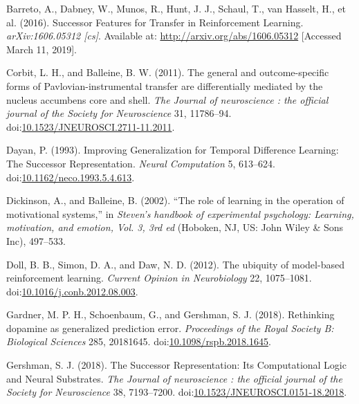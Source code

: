 \documentclass[
  11pt,
]{article}
\newlength{\cslhangindent}
\newlength{\cslentryspacingunit} %
\newenvironment{CSLReferences}[2] %
 {%
  \setlength{\parindent}{0pt}
  \ifodd #1
  \let\oldpar\par
  \def\par{\hangindent=\cslhangindent\oldpar}
  \fi
  \setlength{\parskip}{#2\cslentryspacingunit}
 }%
 {}
\begin{document}
\hypertarget{refs}{}
\begin{CSLReferences}{1}{0}
\leavevmode{}%
Barreto, A., Dabney, W., Munos, R., Hunt, J. J., Schaul, T., van
Hasselt, H., et al. (2016). Successor {Features} for {Transfer} in
{Reinforcement Learning}. \emph{arXiv:1606.05312 {[}cs{]}}. Available
at: \url{http://arxiv.org/abs/1606.05312} {[}Accessed March 11, 2019{]}.

\leavevmode{}%
Corbit, L. H., and Balleine, B. W. (2011). The general and
outcome-specific forms of {Pavlovian}-instrumental transfer are
differentially mediated by the nucleus accumbens core and shell.
\emph{The Journal of neuroscience : the official journal of the Society
for Neuroscience} 31, 11786--94.
doi:\href{https://doi.org/10.1523/JNEUROSCI.2711-11.2011}{10.1523/JNEUROSCI.2711-11.2011}.

\leavevmode{}%
Dayan, P. (1993). Improving {Generalization} for {Temporal Difference
Learning}: The {Successor Representation}. \emph{Neural Computation} 5,
613--624.
doi:\href{https://doi.org/10.1162/neco.1993.5.4.613}{10.1162/neco.1993.5.4.613}.

\leavevmode{}%
Dickinson, A., and Balleine, B. (2002). {``The role of learning in the
operation of motivational systems,''} in \emph{Steven's handbook of
experimental psychology: Learning, motivation, and emotion, {Vol}. 3,
3rd ed} ({Hoboken, NJ, US}: {John Wiley \& Sons Inc}), 497--533.

\leavevmode{}%
Doll, B. B., Simon, D. A., and Daw, N. D. (2012). The ubiquity of
model-based reinforcement learning. \emph{Current Opinion in
Neurobiology} 22, 1075--1081.
doi:\href{https://doi.org/10.1016/j.conb.2012.08.003}{10.1016/j.conb.2012.08.003}.

\leavevmode{}%
Gardner, M. P. H., Schoenbaum, G., and Gershman, S. J. (2018).
Rethinking dopamine as generalized prediction error. \emph{Proceedings
of the Royal Society B: Biological Sciences} 285, 20181645.
doi:\href{https://doi.org/10.1098/rspb.2018.1645}{10.1098/rspb.2018.1645}.

\leavevmode{}%
Gershman, S. J. (2018). The {Successor Representation}: Its
{Computational Logic} and {Neural Substrates}. \emph{The Journal of
neuroscience : the official journal of the Society for Neuroscience} 38,
7193--7200.
doi:\href{https://doi.org/10.1523/JNEUROSCI.0151-18.2018}{10.1523/JNEUROSCI.0151-18.2018}.


\end{CSLReferences}
\end{document}

